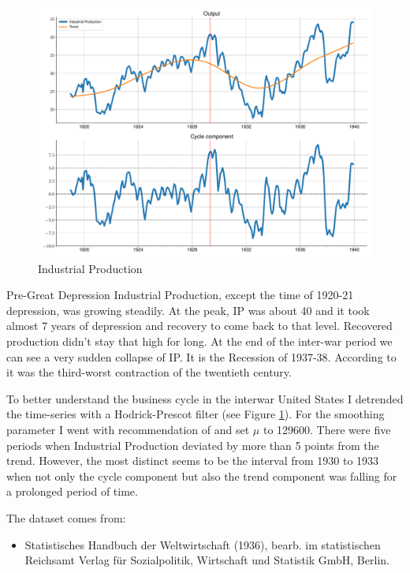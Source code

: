 \documentclass[a4paper,12pt]{article}
\begin{document}
\begin{figure}[!htb]
    \centering
\caption{Industrial Production}
\label{fig:2}
    \includegraphics[width=\textwidth]{../output/figures/ts_IP.pdf} 
\end{figure}

Pre-Great Depression Industrial Production, except the time of 1920-21 depression, was growing steadily. At the peak, IP was about 40 and it took almost 7 years of depression and recovery to come back to that level. Recovered production didn't stay that high for long. At the end of the inter-war period we can see a very sudden collapse of IP. It is the Recession of 1937-38. According to \cite{bordo2012} it was the third-worst contraction of the twentieth century. 

To better understand the business cycle in the interwar United States I detrended the time-series with a Hodrick-Prescot filter (see Figure \ref{fig:2}). For the smoothing parameter I went with recommendation of \cite{morten1997} and set \(\mu\) to 129600. There were five periods when Industrial Production deviated by more than 5 points from the trend. However, the most distinct seems to be the interval from 1930 to 1933 when not only the cycle component but also the trend component was falling for a prolonged period of time. 

The dataset comes from:
\begin{itemize}
		\item Statistisches Handbuch der Weltwirtschaft (1936), bearb. im statistischen Reichsamt
Verlag für Sozialpolitik, Wirtschaft und Statistik GmbH, Berlin.
\end{itemize}
 
\end{document}
